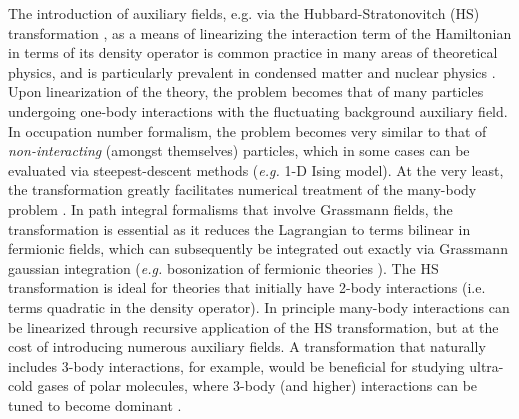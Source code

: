 \documentclass[aps,prl,twocolumn,showpacs,superscriptaddress,groupedaddress, final, nofootinbib]{revtex4}  %
\DeclareRobustCommand{\hlyellow}[1]{{\sethlcolor{yellow}\hl{#1}}}
\newcommand{\comment}[3]{%
\todo[linecolor=yellow,backgroundcolor=yellow!25,bordercolor=yellow]{\textbf{\underline{#2:} }#3}%
\hlyellow{#1}%
}
\begin{document}
The introduction of auxiliary fields, e.g. via the Hubbard-Stratonovitch (HS) transformation \cite{Stratonovich1957,Hubbard1959}, as a means of linearizing the interaction term of the Hamiltonian in terms of its density operator is common practice in many areas of theoretical physics, and is particularly prevalent in condensed matter and nuclear physics \cite{gubernatis2016quantum,Kleinert:2011rb}.
Upon linearization of the theory, the problem becomes that of many particles undergoing one-body interactions with the fluctuating background auxiliary field.
In occupation number formalism, the problem becomes very similar to that of \emph{non-interacting} (amongst themselves) particles, which in some cases can be evaluated via steepest-descent methods (\emph{e.g.} 1-D Ising model).
At the very least, the transformation greatly facilitates numerical
treatment of the many-body problem \cite{Lee:2008fa,Epelbaum:2009pd,Epelbaum:2009,Carlson:2014vla}.
In path integral formalisms that involve Grassmann fields, the transformation is essential as it reduces the Lagrangian to terms bilinear in fermionic fields, which can subsequently be integrated out exactly via Grassmann gaussian integration (\emph{e.g.} bosonization of fermionic theories \cite{kopietz2008bosonization}).
The HS transformation is ideal for theories that initially have 2-body interactions (i.e. terms quadratic in the density operator).
In principle many-body interactions can be linearized through recursive application of the HS transformation, but at the cost of introducing numerous auxiliary fields.  A transformation that naturally includes 3-body interactions, for example, would be beneficial for studying ultra-cold gases of polar molecules, where 3-body (and higher) interactions can be tuned to become dominant \cite{buchler2007,Bonnes2010}.
\end{document}
